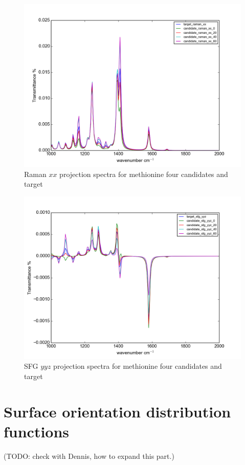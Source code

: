 \begin{figure}[!ht]
\centering
\includegraphics[scale=0.5]{Figures/Met_candidates_plotting_raman_xx.png}
\caption{Raman $xx$ projection spectra for methionine four candidates and target} \label{fig:2.4}
\end{figure}

\begin{figure}[!ht]
\centering
\includegraphics[scale=0.5]{Figures/Met_candidates_plotting_sfg_yyz.png}
\caption{SFG $yyz$ projection spectra for methionine four candidates and target} \label{fig:2.5}
\end{figure}


\section{Surface orientation distribution functions} 
(TODO: check with Dennis, how to expand this part.)





